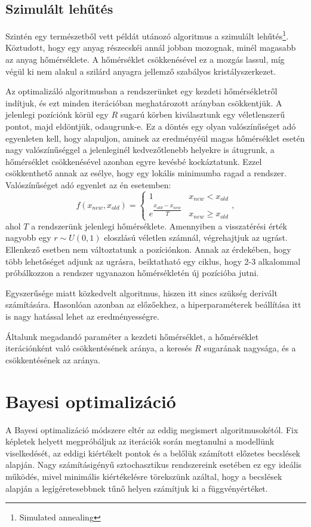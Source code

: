 \subsection{Szimulált lehűtés}

Szintén egy természetből vett példát utánozó algoritmus a szimulált lehűtés\footnote{Simulated annealing}. Köztudott, hogy egy anyag részecskéi annál jobban mozognak, minél magasabb az anyag hőmérséklete. A hőmérséklet csökkenésével ez a mozgás lassul, míg végül ki nem alakul a szilárd anyagra jellemző szabályos kristályszerkezet.

Az optimalizáló algoritmusban a rendszerünket egy kezdeti hőmérsékletről indítjuk, és ezt minden iterációban meghatározott arányban csökkentjük. A jelenlegi pozíciónk körül egy $R$ sugarú körben kiválasztunk egy véletlenszerű pontot, majd eldöntjük, odaugrunk-e. Ez a döntés egy olyan valószínűséget adó egyenleten kell, hogy alapuljon, aminek az eredményéül magas hőmérséklet esetén nagy valószínűséggel a jelenleginél kedvezőtlenebb helyekre is átugrunk, a hőmérséklet csökkenésével azonban egyre kevésbé kockáztatunk. Ezzel csökkenthető annak az esélye, hogy egy lokális minimumba ragad a rendszer.
Valószínűséget adó egyenlet az én esetemben:
\begin{equation*}
f(x_{new},x_{old})=
\begin{cases}
	1 & x_{new}<x_{old}\\
	e^{\dfrac{x_{old}-x_{new}}{T}} & x_{new}\ge x_{old}
\end{cases},
\end{equation*}
ahol $T$ a rendszerünk jelenlegi hőmérséklete. Amennyiben a visszatérési érték nagyobb egy $r\sim U(0,1)$ eloszlású véletlen számnál, végrehajtjuk az ugrást. Ellenkező esetben nem változtatunk a pozíciónkon. Annak az érdekében, hogy több lehetőséget adjunk az ugrásra, beiktatható egy ciklus, hogy 2-3 alkalommal próbálkozzon a rendszer ugyanazon hőmérsékletén új pozícióba jutni.

Egyszerűsége miatt közkedvelt algoritmus, hiszen itt sincs szükség derivált számítására. Hasonlóan azonban az előzőekhez, a hiperparaméterek beállítása itt is nagy hatással lehet az eredményességre.

Általunk megadandó paraméter a kezdeti hőmérséklet, a hőmérséklet iterációnként való csökkentésének aránya, a keresés $R$ sugarának nagysága, és a csökkentésének az aránya.

\section{Bayesi optimalizáció}
A Bayesi optimalizáció módszere eltér az eddig megismert algoritmusokétól. Fix képletek helyett megpróbáljuk az iterációk során megtanulni a modellünk viselkedését, az eddigi kiértékelt pontok és a belőlük számított előzetes becslések alapján. Nagy számításigényű sztochasztikus rendszereink esetében ez egy ideális működés, mivel minimális kiértékelésre törekszünk azáltal, hogy a becslések alapján a legígéretesebbnek tűnő helyen számítjuk ki a függvényértéket.

